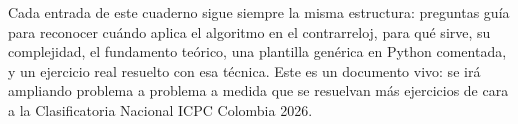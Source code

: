 \begin{figure}[!t]
\centering
\end{figure}

Cada entrada de este cuaderno sigue siempre la misma estructura: preguntas guía para reconocer cuándo aplica el algoritmo en el contrarreloj, para qué sirve, su complejidad, el fundamento teórico, una plantilla genérica en Python comentada, y un ejercicio real resuelto con esa técnica. Este es un documento vivo: se irá ampliando problema a problema a medida que se resuelvan más ejercicios de cara a la Clasificatoria Nacional ICPC Colombia 2026.
